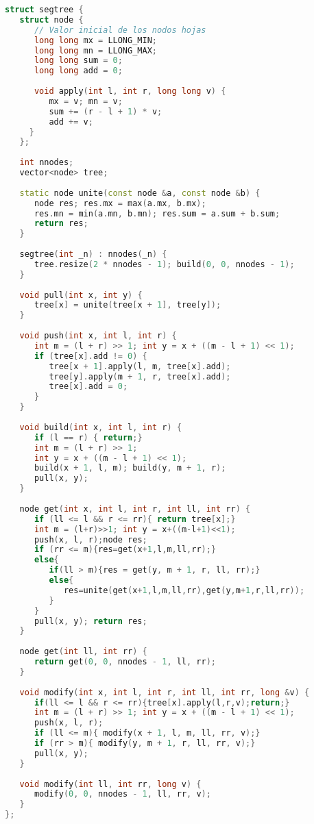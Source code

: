 \begin{lstlisting}[language=C++]
struct segtree {
   struct node {
      // Valor inicial de los nodos hojas
      long long mx = LLONG_MIN;
      long long mn = LLONG_MAX;
      long long sum = 0;
      long long add = 0;
      
      void apply(int l, int r, long long v) {
         mx = v; mn = v;
         sum += (r - l + 1) * v;
         add += v;
     }
   };
   
   int nnodes;
   vector<node> tree;
   
   static node unite(const node &a, const node &b) {
      node res; res.mx = max(a.mx, b.mx);
      res.mn = min(a.mn, b.mn); res.sum = a.sum + b.sum;
      return res;
   }
   
   segtree(int _n) : nnodes(_n) {
      tree.resize(2 * nnodes - 1); build(0, 0, nnodes - 1);
   }
	
   void pull(int x, int y) {
      tree[x] = unite(tree[x + 1], tree[y]);
   }
	
   void push(int x, int l, int r) {
      int m = (l + r) >> 1; int y = x + ((m - l + 1) << 1);
      if (tree[x].add != 0) {
         tree[x + 1].apply(l, m, tree[x].add);
         tree[y].apply(m + 1, r, tree[x].add);
         tree[x].add = 0;
      }
   }
	
   void build(int x, int l, int r) {
      if (l == r) { return;}
      int m = (l + r) >> 1;
      int y = x + ((m - l + 1) << 1);
      build(x + 1, l, m); build(y, m + 1, r);
      pull(x, y);
   }
	
   node get(int x, int l, int r, int ll, int rr) {
      if (ll <= l && r <= rr){ return tree[x];}
      int m = (l+r)>>1; int y = x+((m-l+1)<<1);
      push(x, l, r);node res;
      if (rr <= m){res=get(x+1,l,m,ll,rr);} 
      else{ 
         if(ll > m){res = get(y, m + 1, r, ll, rr);}
         else{
            res=unite(get(x+1,l,m,ll,rr),get(y,m+1,r,ll,rr));
         }
      }
      pull(x, y); return res;
   }
	
   node get(int ll, int rr) {
      return get(0, 0, nnodes - 1, ll, rr);
   }
   
   void modify(int x, int l, int r, int ll, int rr, long &v) {
      if(ll <= l && r <= rr){tree[x].apply(l,r,v);return;}
      int m = (l + r) >> 1; int y = x + ((m - l + 1) << 1);
      push(x, l, r);
      if (ll <= m){ modify(x + 1, l, m, ll, rr, v);}
      if (rr > m){ modify(y, m + 1, r, ll, rr, v);}
      pull(x, y);
   }
   
   void modify(int ll, int rr, long v) {
      modify(0, 0, nnodes - 1, ll, rr, v);
   }
};


\end{lstlisting}
